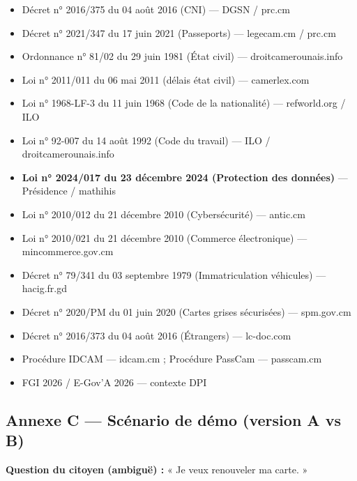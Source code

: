 \documentclass[
]{article}
\providecommand{\tightlist}{%
  \setlength{\itemsep}{0pt}\setlength{\parskip}{0pt}}
\begin{document}
\begin{itemize}
\tightlist
\item
  Décret n° 2016/375 du 04 août 2016 (CNI) --- DGSN / prc.cm
\item
  Décret n° 2021/347 du 17 juin 2021 (Passeports) --- legecam.cm /
  prc.cm
\item
  Ordonnance n° 81/02 du 29 juin 1981 (État civil) ---
  droitcamerounais.info
\item
  Loi n° 2011/011 du 06 mai 2011 (délais état civil) --- camerlex.com
\item
  Loi n° 1968-LF-3 du 11 juin 1968 (Code de la nationalité) ---
  refworld.org / ILO
\item
  Loi n° 92-007 du 14 août 1992 (Code du travail) --- ILO /
  droitcamerounais.info
\item
  \textbf{Loi n° 2024/017 du 23 décembre 2024 (Protection des données)}
  --- Présidence / mathihis
\item
  Loi n° 2010/012 du 21 décembre 2010 (Cybersécurité) --- antic.cm
\item
  Loi n° 2010/021 du 21 décembre 2010 (Commerce électronique) ---
  mincommerce.gov.cm
\item
  Décret n° 79/341 du 03 septembre 1979 (Immatriculation véhicules) ---
  hacig.fr.gd
\item
  Décret n° 2020/PM du 01 juin 2020 (Cartes grises sécurisées) ---
  spm.gov.cm
\item
  Décret n° 2016/373 du 04 août 2016 (Étrangers) --- lc-doc.com
\item
  Procédure IDCAM --- idcam.cm ; Procédure PassCam --- passcam.cm
\item
  FGI 2026 / E-Gov'A 2026 --- contexte DPI
\end{itemize}

\subsection{Annexe C --- Scénario de démo (version A vs
B)}\label{annexe-c-scuxe9nario-de-duxe9mo-version-a-vs-b}

\textbf{Question du citoyen (ambiguë) :} « Je veux renouveler ma carte.
»
\end{document}

